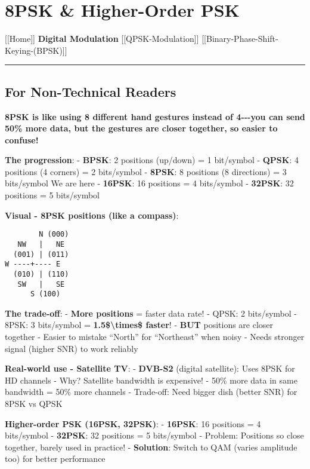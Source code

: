 \section{8PSK \& Higher-Order PSK}\label{psk-higher-order-psk}

{[}{[}Home{]}{]} \textbar{} \textbf{Digital Modulation} \textbar{}
{[}{[}QPSK-Modulation{]}{]} \textbar{}
{[}{[}Binary-Phase-Shift-Keying-(BPSK){]}{]}

\begin{center}\rule{0.5\linewidth}{0.5pt}\end{center}

\subsection{\texorpdfstring{ For Non-Technical
Readers}{ For Non-Technical Readers}}\label{for-non-technical-readers}

\textbf{8PSK is like using 8 different hand gestures instead of
4-\/-\/-you can send 50\% more data, but the gestures are closer
together, so easier to confuse!}

\textbf{The progression}: - \textbf{BPSK}: 2 positions (up/down) = 1
bit/symbol - \textbf{QPSK}: 4 positions (4 corners) = 2 bits/symbol -
\textbf{8PSK}: 8 positions (8 directions) = 3 bits/symbol We are here -
\textbf{16PSK}: 16 positions = 4 bits/symbol - \textbf{32PSK}: 32
positions = 5 bits/symbol

\textbf{Visual - 8PSK positions (like a compass)}:

\begin{verbatim}
        N (000)
   NW   |   NE
  (001) | (011)
W ----+---- E
  (010) | (110)
   SW   |   SE
      S (100)
\end{verbatim}

\textbf{The trade-off}: - \textbf{More positions} = faster data rate! -
QPSK: 2 bits/symbol - 8PSK: 3 bits/symbol =
\textbf{1.5\$\textbackslash times\$ faster}! - \textbf{BUT} positions
are closer together - Easier to mistake ``North'' for ``Northeast'' when
noisy - Needs stronger signal (higher SNR) to work reliably

\textbf{Real-world use - Satellite TV}: - \textbf{DVB-S2} (digital
satellite): Uses 8PSK for HD channels - Why? Satellite bandwidth is
expensive! - 50\% more data in same bandwidth = 50\% more channels -
Trade-off: Need bigger dish (better SNR) for 8PSK vs QPSK

\textbf{Higher-order PSK (16PSK, 32PSK)}: - \textbf{16PSK}: 16 positions
= 4 bits/symbol - \textbf{32PSK}: 32 positions = 5 bits/symbol -
Problem: Positions so close together, barely used in practice! -
\textbf{Solution}: Switch to QAM (varies amplitude too) for better
performance


